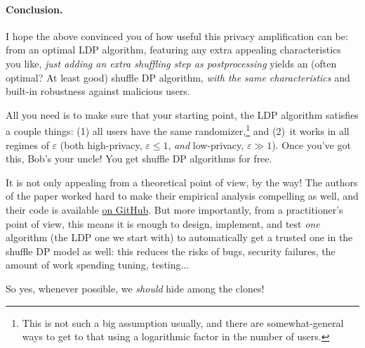 \documentclass[11pt]{article}
\begin{document}
\paragraph{Conclusion.} I hope the above convinced you of how useful this privacy amplification can be: from an optimal LDP algorithm, featuring any extra appealing characteristics you like, \emph{just adding an extra shuffling step as postprocessing} yields an (often optimal? At least good) shuffle DP algorithm, \emph{with the same characteristics} and built-in robustness against malicious users.

All you need is to make sure that your starting point, the LDP algorithm satisfies a couple things: (1) all users have the same randomizer,\footnote{This is not such a big assumption usually, and there are somewhat-general ways to get to that using a logarithmic factor in the number of users.} and (2)~it works in all regimes of $\varepsilon$ (both high-privacy, $\varepsilon \leq 1$, \emph{and} low-privacy, $\varepsilon \gg 1$). Once you've got this, Bob's your uncle! You get shuffle DP algorithms for free.

It is not only appealing from a theoretical point of view, by the way! The authors of the paper worked hard to make their empirical analysis compelling as well, and their code is available \href{https://github.com/apple/ml-shuffling-amplification}{on GitHub}. But more importantly, from a practitioner's point of view, this means it is enough to design, implement, and test \emph{one} algorithm (the LDP one we start with) to automatically get a trusted one in the shuffle DP model as well: this reduces the risks of bugs, security failures, the amount of work spending tuning, testing...

\noindent So yes, whenever possible, we \emph{should} hide among the clones!
\end{document}
